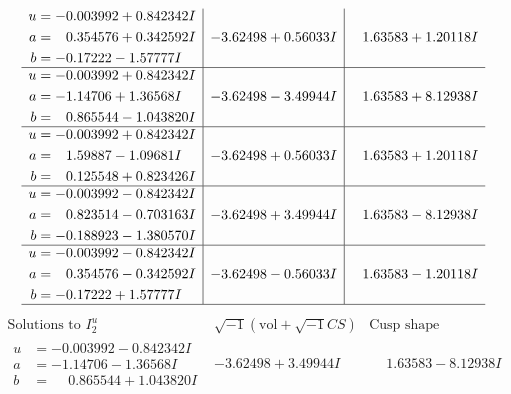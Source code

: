 \documentclass[1p]{elsarticle_modified}
\theoremstyle{definition}
\newcommand{\I}{\sqrt{-1}}
\begin{document}
$$\begin{array}{c|c|c}
\begin{aligned}
u &= -0.003992 + 0.842342 I \\
a &= \phantom{-}0.354576 + 0.342592 I \\
b &= -0.17222 - 1.57777 I\end{aligned}
 & -3.62498 + 0.56033 I & \phantom{-}1.63583 + 1.20118 I \\ \hline\begin{aligned}
u &= -0.003992 + 0.842342 I \\
a &= -1.14706 + 1.36568 I \\
b &= \phantom{-}0.865544 - 1.043820 I\end{aligned}
 & -3.62498 - 3.49944 I & \phantom{-}1.63583 + 8.12938 I \\ \hline\begin{aligned}
u &= -0.003992 + 0.842342 I \\
a &= \phantom{-}1.59887 - 1.09681 I \\
b &= \phantom{-}0.125548 + 0.823426 I\end{aligned}
 & -3.62498 + 0.56033 I & \phantom{-}1.63583 + 1.20118 I \\ \hline\begin{aligned}
u &= -0.003992 - 0.842342 I \\
a &= \phantom{-}0.823514 - 0.703163 I \\
b &= -0.188923 - 1.380570 I\end{aligned}
 & -3.62498 + 3.49944 I & \phantom{-}1.63583 - 8.12938 I \\ \hline\begin{aligned}
u &= -0.003992 - 0.842342 I \\
a &= \phantom{-}0.354576 - 0.342592 I \\
b &= -0.17222 + 1.57777 I\end{aligned}
 & -3.62498 - 0.56033 I & \phantom{-}1.63583 - 1.20118 I\\
 \hline 
 \end{array}$$\newpage$$\begin{array}{c|c|c}  
\text{Solutions to }I^u_{2}& \I (\text{vol} + \sqrt{-1}CS) & \text{Cusp shape}\\
 \hline 
\begin{aligned}
u &= -0.003992 - 0.842342 I \\
a &= -1.14706 - 1.36568 I \\
b &= \phantom{-}0.865544 + 1.043820 I\end{aligned}
 & -3.62498 + 3.49944 I & \phantom{-}1.63583 - 8.12938 I \\ \hline\begin{aligned}

\end{aligned}
\end{array}$$
\end{document}
